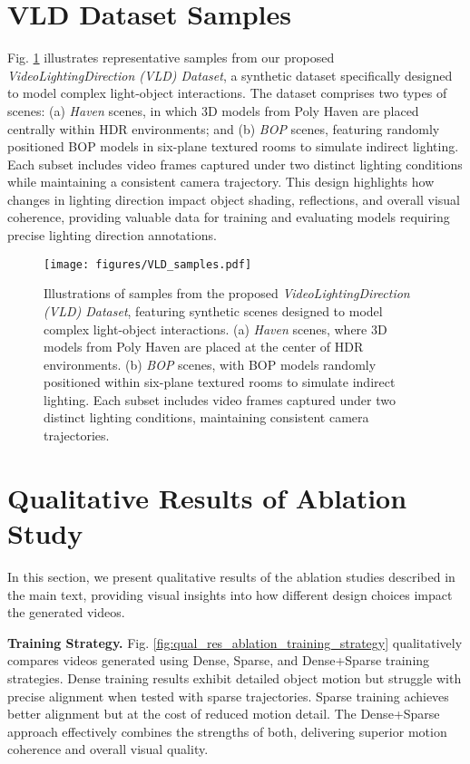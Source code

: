 \section{VLD Dataset Samples}

Fig. \ref{fig:VLD_samples} illustrates representative samples from our proposed \textit{VideoLightingDirection (VLD) Dataset}, a synthetic dataset specifically designed to model complex light-object interactions. The dataset comprises two types of scenes: (a) \textit{Haven} scenes, in which 3D models from Poly Haven are placed centrally within HDR environments; and (b) \textit{BOP} scenes, featuring randomly positioned BOP models in six-plane textured rooms to simulate indirect lighting. Each subset includes video frames captured under two distinct lighting conditions while maintaining a consistent camera trajectory. This design highlights how changes in lighting direction impact object shading, reflections, and overall visual coherence, providing valuable data for training and evaluating models requiring precise lighting direction annotations.

\begin{figure}[t]
    \centering
    \texttt{[image: figures/VLD\_samples.pdf]}
    \caption{Illustrations of samples from the proposed \textit{VideoLightingDirection (VLD) Dataset}, featuring synthetic scenes designed to model complex light-object interactions. (a) \textit{Haven} scenes, where 3D models from Poly Haven are placed at the center of HDR environments. (b) \textit{BOP} scenes, with BOP models randomly positioned within six-plane textured rooms to simulate indirect lighting. Each subset includes video frames captured under two distinct lighting conditions, maintaining consistent camera trajectories.
    }   
    \label{fig:VLD_samples}
\end{figure}


\section{Qualitative Results of Ablation Study}
In this section, we present qualitative results of the ablation studies described in the main text, providing visual insights into how different design choices impact the generated videos.

\noindent\textbf{Training Strategy.}
Fig. \ref{fig:qual_res_ablation_training_strategy} qualitatively compares videos generated using Dense, Sparse, and Dense+Sparse training strategies. Dense training results exhibit detailed object motion but struggle with precise alignment when tested with sparse trajectories. Sparse training achieves better alignment but at the cost of reduced motion detail. The Dense+Sparse approach effectively combines the strengths of both, delivering superior motion coherence and overall visual quality.

